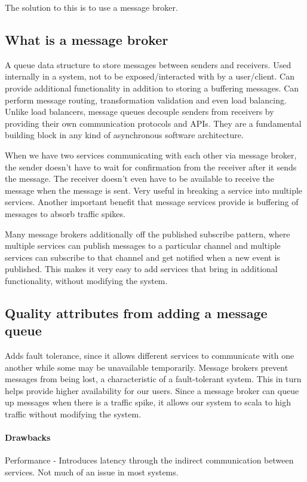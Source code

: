 The solution to this is to use a message broker.

\subsection{What is a message broker}
A queue data structure to store messages between senders and receivers.
Used internally in a system, not to be exposed/interacted with by a user/client.
Can provide additional functionality in addition to storing a buffering messages.
Can perform message routing, transformation validation and even load balancing.
Unlike load balancers, message queues decouple senders from receivers by providing their own communication protocols and APIs.
They are a fundamental building block in any kind of asynchronous software architecture.

When we have two services communicating with each other via message broker, the sender doesn't have to wait for confirmation from the receiver after it sends the message.
The receiver doesn't even have to be available to receive the message when the message is sent.
Very useful in breaking a service into multiple services.
Another important benefit that message services provide is buffering of messages to absorb traffic spikes.

Many message brokers additionally off the published subscribe pattern, where multiple services can publish messages to a particular channel and multiple services can subscribe to that channel and get notified when a new event is published.
This makes it very easy to add services that bring in additional functionality, without modifying the system.

\subsection{Quality attributes from adding a message queue}
Adds fault tolerance, since it allows different services to communicate with one another while some may be unavailable temporarily.
Message brokers prevent messages from being lost, a characteristic of a fault-tolerant system.
This in turn helps provide higher availability for our users.
Since a message broker can queue up messages when there is a traffic spike, it allows our system to scala to high traffic without modifying the system.

\paragraph{Drawbacks}
Performance - Introduces latency through the indirect communication between services.
Not much of an issue in most systems.

